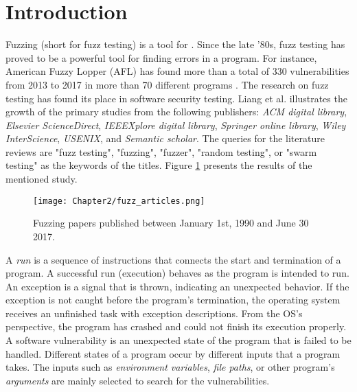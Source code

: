 \section{Introduction} \label{sec:2.1}




Fuzzing (short for fuzz testing) is a tool for . Since the late '80s, fuzz testing has proved to be a powerful tool for finding errors in a program. For instance, American Fuzzy Lopper (AFL) has found more than a total of 330 vulnerabilities from 2013 to 2017 in more than 70 different programs \cite{afl_cve}. The research on fuzz testing has found its place in software security testing. Liang et al. \cite{liang2018fuzzing} illustrates the growth of the primary studies from the following publishers: \textit{ACM digital library}, \textit{Elsevier ScienceDirect}, \textit{IEEEXplore digital library}, \textit{Springer online library}, \textit{Wiley InterScience}, \textit{USENIX}, and \textit{Semantic scholar}. The queries for the literature reviews are "fuzz testing", "fuzzing", "fuzzer", "random testing", or "swarm testing" as the keywords of the titles. Figure \ref{fig:fuzz_articles} presents the results of the mentioned study.

\begin{figure}[!t]
    \texttt{[image: Chapter2/fuzz\_articles.png]}
    \centering
    \caption{Fuzzing papers published between January 1st, 1990 and June 30 2017. \cite{liang2018fuzzing}}
    \label{fig:fuzz_articles}
\end{figure}

A \textit{run} is a sequence of instructions that connects the start and termination of a program. A successful run (execution) behaves as the program is intended to run. An exception is a signal that is thrown, indicating an unexpected behavior. If the exception is not caught before the program's termination, the operating system receives an unfinished task with exception descriptions. From the OS's perspective, the program has crashed and could not finish its execution properly. A software vulnerability is an unexpected state of the program that is failed to be handled. Different states of a program occur by different inputs that a program takes. The inputs such as \textit{environment variables}, \textit{file paths}, or other program's \textit{arguments} are mainly selected to search for the vulnerabilities. 

